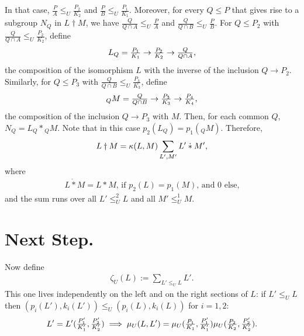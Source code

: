 \documentclass[12pt,a4paper]{amsart}
\begin{document}
In that case, $\tfrac{P}{A} \leq_U \tfrac{P_2}{K_2}$
and $\tfrac{P}{B} \leq_U \tfrac{P_1}{K_1}$.  Moreover, for every $Q \leq P$ that gives rise
to a subgroup $N_Q$ in $L \dagger M$, we have
$\tfrac{Q}{Q \cap A} \leq_U \tfrac{P}{A}$ and
$\tfrac{Q}{Q \cap B} \leq_U \tfrac{P}{B}$.  For $Q \leq P_2$ with $\tfrac{Q}{Q \cap A} \leq_U \tfrac{P_2}{K_2}$, define
\begin{align*}
  L_Q = \tfrac{P_1}{K_1} \to \tfrac{P_2}{K_2} \to \tfrac{Q}{Q \cap A}\text,
\end{align*}
the composition of the isomorphism $L$ with the inverse of the inclusion $Q \to P_2$.
Similarly, for $Q \leq P_3$ with $\tfrac{Q}{Q \cap B} \leq_U \tfrac{P_3}{K_3}$, define
\begin{align*}
  {}_QM = \tfrac{Q}{Q \cap B} \to \tfrac{P_3}{K_3} \to \tfrac{P_4}{K_4}\text,
\end{align*}
the composition of the inclusion $Q \to P_3$ with $M$.  Then, for each common $Q$, $N_Q = L_Q * {}_QM$.
Note that in this case $p_2(L_Q) = p_1({}_QM)$.  Therefore,
\begin{align*}
  L \dagger M = \kappa(L, M) \sum_{L',M'} L' \mathbin{\dot{*}} M'\text,
\end{align*}
where
\begin{align*}
  L \mathbin{\dot{*}} M = L * M\text{, if } p_2(L) = p_1(M)\text{, and } 0 \text{ else,}
\end{align*}
and the sum runs over all $L' \leq_U^2 L$ and all $M' \leq_U^1 M$.



\section{Next Step.}
\label{sec:next-step}

Now define
\begin{align*}
  \zeta_U(L) := \sum_{L' \leq_U L} L'.
\end{align*}
This one lives independently on the left and on the right sections of $L$:
if $L' \leq_U L$ then $(p_i(L'), k_i(L')) \leq_U (p_i(L), k_i(L))$ for $i = 1, 2$:
\begin{align*}
  L' = L'(\tfrac{P_1'}{K_1'}, \tfrac{P_2'}{K_2'}) \implies
  \mu_U(L, L') = \mu_U(\tfrac{P_1}{K_1}, \tfrac{P_1'}{K_1'}) \mu_U(\tfrac{P_2}{K_2}, \tfrac{P_2'}{K_2'})\text.
\end{align*}
\end{document}
